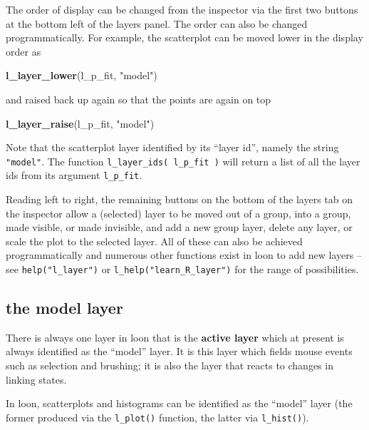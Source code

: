 \documentclass[]{article}
\newenvironment{Shaded}{\begin{snugshade}}{\end{snugshade}}
\newcommand{\KeywordTok}[1]{\textcolor[rgb]{0.13,0.29,0.53}{\textbf{#1}}}
\newcommand{\StringTok}[1]{\textcolor[rgb]{0.31,0.60,0.02}{#1}}
\newcommand{\NormalTok}[1]{#1}
\begin{document}
The order of display can be changed from the inspector via the first two
buttons at the bottom left of the layers panel. The order can also be
changed programmatically. For example, the scatterplot can be moved
lower in the display order as

\begin{Shaded}
\begin{Highlighting}[]
\KeywordTok{l_layer_lower}\NormalTok{(l_p_fit, }\StringTok{"model"}\NormalTok{)}
\end{Highlighting}
\end{Shaded}

and raised back up again so that the points are again on top

\begin{Shaded}
\begin{Highlighting}[]
\KeywordTok{l_layer_raise}\NormalTok{(l_p_fit, }\StringTok{"model"}\NormalTok{)}
\end{Highlighting}
\end{Shaded}

Note that the scatterplot layer identified by its ``layer id'', namely
the string \texttt{"model"}. The function
\texttt{l\_layer\_ids(\ l\_p\_fit\ )} will return a list of all the
layer ids from its argument \texttt{l\_p\_fit}.

Reading left to right, the remaining buttons on the bottom of the layers
tab on the inspector allow a (selected) layer to be moved out of a
group, into a group, made visible, or made invisible, and add a new
group layer, delete any layer, or scale the plot to the selected layer.
All of these can also be achieved programmatically and numerous other
functions exist in loon to add new layers -- see
\texttt{help("l\_layer")} or \texttt{l\_help("learn\_R\_layer")} for the
range of possibilities.

\subsection{the model layer}\label{the-model-layer}

There is always one layer in loon that is the \textbf{active layer}
which at present is always identified as the ``model'' layer. It is this
layer which fields mouse events such as selection and brushing; it is
also the layer that reacts to changes in linking states.

In loon, scatterplots and histograms can be identified as the ``model''
layer (the former produced via the \texttt{l\_plot()} function, the
latter via \texttt{l\_hist()}).
\end{document}
